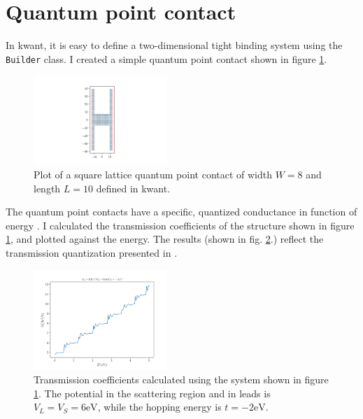 \documentclass[11pt, a4paper, twocolumn]{article}
\begin{document}
\section*{Quantum point contact}

In kwant, it is easy to define a two-dimensional tight binding system using the \texttt{Builder} class.
I created a simple quantum point contact shown in figure \ref{fig:2degconst_W8_L10}.
\begin{figure}[H]
  \begin{center}
  \includegraphics[width=0.45\textwidth]{./media/2degconst_W8_L10.png}
  \caption{Plot of a square lattice quantum point contact of width $W=8$ and
  length $L=10$ defined in kwant.}
  \label{fig:2degconst_W8_L10}
  \end{center}
\end{figure}

The quantum point contacts have a specific, quantized conductance in function of energy \cite{QPCarticle}.
I calculated the transmission coefficients of the structure shown in figure \ref{fig:2degconst_W8_L10},
and plotted against the energy. The results (shown in fig. \ref{fig:2deg_conductivity_W40_L20_VL6_0_VS6_0.png}.)
reflect the transmission quantization presented in \cite{QPCarticle}.
\begin{figure}[H]
  \begin{center}
  \includegraphics[width=0.45\textwidth]{./media/2deg_conductivity_W40_L20_VL6_0_VS6_0.png}
  \caption{Transmission coefficients calculated using the system shown in figure \ref{fig:2degconst_W8_L10}.
  The potential in the scattering region and in leads is $V_L=V_S=6\textrm{eV}$, while the
  hopping energy is $t=-2\textrm{eV}$.}
  \label{fig:2deg_conductivity_W40_L20_VL6_0_VS6_0.png}
  \end{center}
\end{figure}
\end{document}
